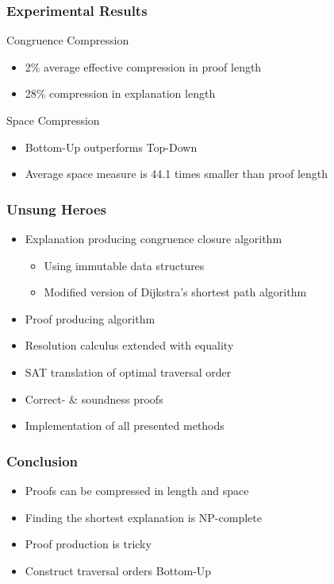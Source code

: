 \documentclass{beamer}
\begin{document}
\begin{frame}

\frametitle{Experimental Results}

\begin{block}{Congruence Compression}
	\begin{itemize}
		\item 2\% average effective compression in proof length
		\item 28\% compression in explanation length
	\end{itemize}
\end{block}

\begin{block}{Space Compression}
	\begin{itemize}
		\item Bottom-Up outperforms Top-Down
		\item Average space measure is 44.1 times smaller than proof length
	\end{itemize}
\end{block}

\end{frame}

\begin{frame}

\frametitle{Unsung Heroes}

\begin{itemize}
	\item Explanation producing congruence closure algorithm
	\begin{itemize}
		\item Using immutable data structures
		\item Modified version of Dijkstra's shortest path algorithm
	\end{itemize}
	\item Proof producing algorithm
	\item Resolution calculus extended with equality
	\item SAT translation of optimal traversal order
	\item Correct- \&  soundness proofs
	\item Implementation of all presented methods
\end{itemize}

\end{frame}

\begin{frame}

\frametitle{Conclusion}

\begin{itemize}
	\item Proofs can be compressed in length and space
	\item Finding the shortest explanation is NP-complete
	\item Proof production is tricky
	\item Construct traversal orders Bottom-Up
\end{itemize}

\end{frame}
\end{document}
